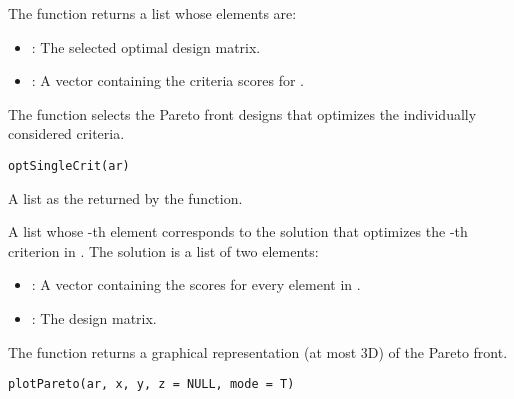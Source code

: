 \documentclass[a4paper]{book}
\begin{document}
%
\begin{Value}
The  function returns a list whose elements are:
\begin{itemize}

\item{} : The selected optimal design matrix.
\item{} : A vector containing the criteria scores for .

\end{itemize}

\end{Value}
%
\begin{Description}\relax
The  function selects the Pareto front designs
that optimizes the individually considered criteria.
\end{Description}
%
\begin{Usage}
\begin{verbatim}
optSingleCrit(ar)
\end{verbatim}
\end{Usage}
%
\begin{Arguments}
\begin{ldescription}
\item[\code{ar}] A list as the  returned by the  function.
\end{ldescription}
\end{Arguments}
%
\begin{Value}
A list whose -th element corresponds to the solution that optimizes
the -th criterion in . The solution is a list of two elements:
\begin{itemize}

\item{} : A vector containing the scores for every element in .
\item{} : The design matrix.

\end{itemize}

\end{Value}
%
\begin{Description}\relax
The  function returns a graphical representation
(at most 3D) of the Pareto front.
\end{Description}
%
\begin{Usage}
\begin{verbatim}
plotPareto(ar, x, y, z = NULL, mode = T)
\end{verbatim}
\end{Usage}
\end{document}
